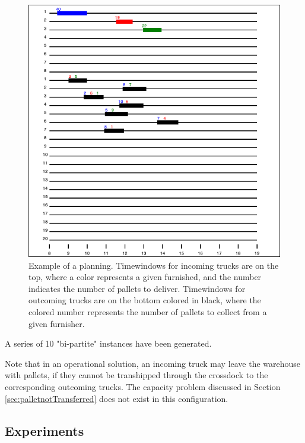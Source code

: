 \documentclass[preprint,12pt,authoryear]{elsarticle}
\begin{document}
\noindent 
\begin{figure}[h!]
\centering
\includegraphics[scale=0.5]{images/TDAPplanning.png}
\caption{Example of a planning. Timewindows for incoming trucks are on the top, where a color represents a given furnished, and the number indicates the number of pallets to deliver. Timewindows for outcoming trucks are on the bottom colored in black, where the colored number represents the number of pallets to collect from a given furnisher.}
\label{fig:planning}
\end{figure}


A series of 10 "bi-partite" instances have been generated.

%
Note that in an operational solution, an incoming truck may leave the warehouse with pallets, if they cannot be transhipped through the crossdock to the corresponding outcoming trucks. The capacity problem discussed in Section \ref{sec:palletnotTransferred} does not exist in this configuration.


\newpage
%
%
\subsection{Experiments}
\end{document}

